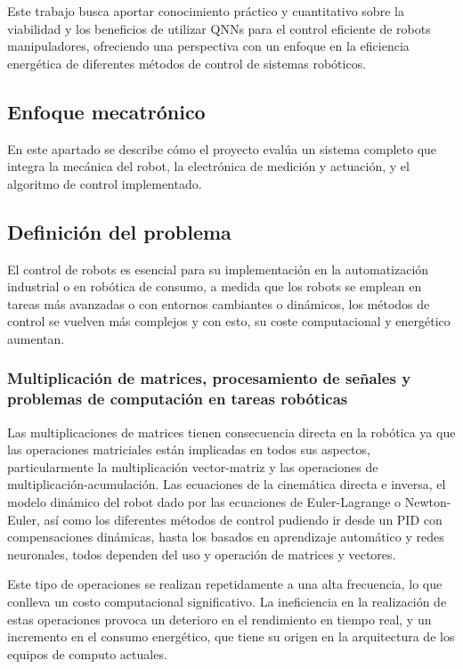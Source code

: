 \documentclass[12pt]{article}
\begin{document}
Este trabajo busca aportar conocimiento práctico y cuantitativo sobre la viabilidad y los beneficios de utilizar QNNs para el control eficiente de robots manipuladores, ofreciendo una perspectiva con un enfoque en la eficiencia energética de diferentes métodos de control de sistemas robóticos.

\subsection*{Enfoque mecatrónico}
En este apartado se describe cómo el proyecto evalúa un sistema completo que integra la mecánica del robot, la electrónica de medición y actuación, y el algoritmo de control implementado.

\subsection*{Definición del problema}
El control de robots es esencial para su implementación en la automatización industrial o en robótica de consumo, a medida que los robots se emplean en tareas más avanzadas o con entornos cambiantes o dinámicos, los métodos de control se vuelven más complejos y con esto, su coste computacional y energético aumentan\cite{JuarezLora2024Thesis, Park2025electronics}.
\subsubsection{Multiplicación de matrices, procesamiento de señales y problemas de computación en tareas robóticas}
Las multiplicaciones de matrices tienen consecuencia directa en la robótica ya que las operaciones matriciales están implicadas en todos sus aspectos, particularmente la multiplicación vector-matriz y las operaciones de multiplicación-acumulación. Las ecuaciones de la cinemática directa e inversa, el modelo dinámico del robot dado por las ecuaciones de Euler-Lagrange o Newton-Euler, así como los diferentes métodos de control pudiendo ir desde un PID con compensaciones dinámicas, hasta los basados en aprendizaje automático y redes neuronales, todos dependen del uso y operación de matrices y vectores.\cite{Chen2021memristor,modern_robotics}

Este tipo de operaciones se realizan repetidamente a una alta frecuencia, lo que conlleva un costo computacional significativo. La ineficiencia en la realización de estas operaciones provoca un deterioro en el rendimiento en tiempo real, y un incremento en el consumo energético, que tiene su origen en la arquitectura de los equipos de computo actuales. 
\end{document}
